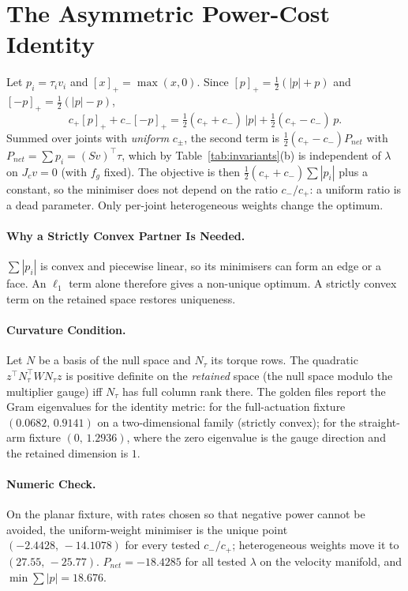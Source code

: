\documentclass[11pt,a4paper]{article}
\begin{document}
\section{The Asymmetric Power-Cost Identity}
\label{sec:cpm}

Let $p_i=\tau_iv_i$ and $[x]_+=\max(x,0)$.  Since $[p]_+=\tfrac12(|p|+p)$ and
$[-p]_+=\tfrac12(|p|-p)$,
\begin{equation}
c_+[p]_+ + c_-[-p]_+=\tfrac12(c_++c_-)\,|p|+\tfrac12(c_+-c_-)\,p .
\end{equation}
Summed over joints with \emph{uniform} $c_\pm$, the second term is
$\tfrac12(c_+-c_-)P_{net}$ with $P_{net}=\sum p_i=(Sv)^{\top}\tau$, which by
Table~\ref{tab:invariants}(b) is independent of $\lambda$ on $J_cv=0$ (with
$f_g$ fixed).  The objective is then $\tfrac12(c_++c_-)\sum|p_i|$ plus a
constant, so the minimiser does not depend on the ratio $c_-/c_+$: a uniform
ratio is a dead parameter.  Only per-joint heterogeneous weights change the
optimum.

\paragraph{Why a Strictly Convex Partner Is Needed.}
$\sum|p_i|$ is convex and piecewise linear, so its minimisers can form an edge
or a face.  An $\ell_1$ term alone therefore gives a non-unique optimum.  A
strictly convex term on the retained space restores uniqueness.

\paragraph{Curvature Condition.}
Let $N$ be a basis of the null space and $N_\tau$ its torque rows.  The
quadratic $z^{\top}N_\tau^{\top}WN_\tau z$ is positive definite on the
\emph{retained} space (the null space modulo the multiplier gauge) iff $N_\tau$
has full column rank there.  The golden files report the Gram eigenvalues for
the identity metric: for the full-actuation fixture $(0.0682,\,0.9141)$ on a
two-dimensional family (strictly convex); for the straight-arm fixture
$(0,\,1.2936)$, where the zero eigenvalue is the gauge direction and the
retained dimension is $1$.

\paragraph{Numeric Check.}
On the planar fixture, with rates chosen so that negative power cannot be
avoided, the uniform-weight minimiser is the unique point $(-2.4428,\,-14.1078)$
for every tested $c_-/c_+$; heterogeneous weights move it to
$(27.55,\,-25.77)$.  $P_{net}=-18.4285$ for all tested $\lambda$ on the
velocity manifold, and $\min\sum|p|=18.676$.
\end{document}
